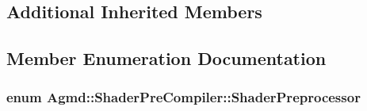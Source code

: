 \subsection*{Additional Inherited Members}


\subsection{Member Enumeration Documentation}
\hypertarget{class_agmd_1_1_shader_pre_compiler_aa972735de2129e4ea164dbb29d8ce83f}{
\subsubsection[{Shader\+Preprocessor}]{\setlength{\rightskip}{0pt plus 5cm}enum {\bf Agmd\+::\+Shader\+Pre\+Compiler\+::\+Shader\+Preprocessor}}}\label{class_agmd_1_1_shader_pre_compiler_aa972735de2129e4ea164dbb29d8ce83f}
